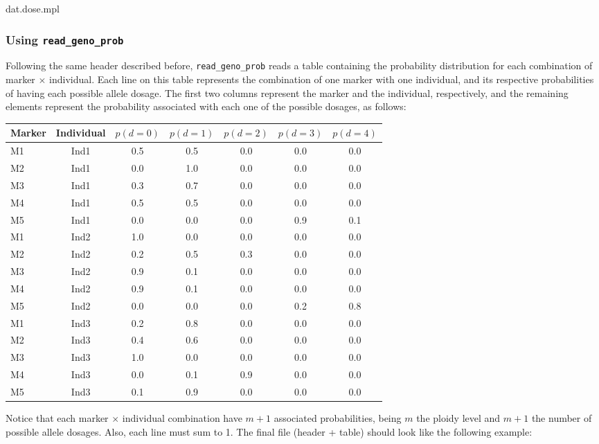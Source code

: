 \documentclass[
]{article}
\newenvironment{Shaded}{}{}
\newcommand{\NormalTok}[1]{#1}
\begin{document}
\begin{Shaded}
\begin{Highlighting}[]
\NormalTok{dat.dose.mpl}
\end{Highlighting}
\end{Shaded}

\hypertarget{using-read_geno_prob}{%
\subsubsection{\texorpdfstring{Using
\texttt{read\_geno\_prob}}{Using read\_geno\_prob}}\label{using-read_geno_prob}}

Following the same header described before, \texttt{read\_geno\_prob}
reads a table containing the probability distribution for each
combination of marker \(\times\) individual. Each line on this table
represents the combination of one marker with one individual, and its
respective probabilities of having each possible allele dosage. The
first two columns represent the marker and the individual, respectively,
and the remaining elements represent the probability associated with
each one of the possible dosages, as follows:

\begin{longtable}[]{@{}lcccccc@{}}
\toprule
Marker & Individual & \(p(d=0)\) & \(p(d=1)\) & \(p(d=2)\) & \(p(d=3)\)
& \(p(d=4)\)\tabularnewline
\midrule
\endhead
M1 & Ind1 & 0.5 & 0.5 & 0.0 & 0.0 & 0.0\tabularnewline
M2 & Ind1 & 0.0 & 1.0 & 0.0 & 0.0 & 0.0\tabularnewline
M3 & Ind1 & 0.3 & 0.7 & 0.0 & 0.0 & 0.0\tabularnewline
M4 & Ind1 & 0.5 & 0.5 & 0.0 & 0.0 & 0.0\tabularnewline
M5 & Ind1 & 0.0 & 0.0 & 0.0 & 0.9 & 0.1\tabularnewline
M1 & Ind2 & 1.0 & 0.0 & 0.0 & 0.0 & 0.0\tabularnewline
M2 & Ind2 & 0.2 & 0.5 & 0.3 & 0.0 & 0.0\tabularnewline
M3 & Ind2 & 0.9 & 0.1 & 0.0 & 0.0 & 0.0\tabularnewline
M4 & Ind2 & 0.9 & 0.1 & 0.0 & 0.0 & 0.0\tabularnewline
M5 & Ind2 & 0.0 & 0.0 & 0.0 & 0.2 & 0.8\tabularnewline
M1 & Ind3 & 0.2 & 0.8 & 0.0 & 0.0 & 0.0\tabularnewline
M2 & Ind3 & 0.4 & 0.6 & 0.0 & 0.0 & 0.0\tabularnewline
M3 & Ind3 & 1.0 & 0.0 & 0.0 & 0.0 & 0.0\tabularnewline
M4 & Ind3 & 0.0 & 0.1 & 0.9 & 0.0 & 0.0\tabularnewline
M5 & Ind3 & 0.1 & 0.9 & 0.0 & 0.0 & 0.0\tabularnewline
\bottomrule
\end{longtable}

Notice that each marker \(\times\) individual combination have \(m+1\)
associated probabilities, being \(m\) the ploidy level and \(m+1\) the
number of possible allele dosages. Also, each line must sum to 1. The
final file (header + table) should look like the following example:
\end{document}
